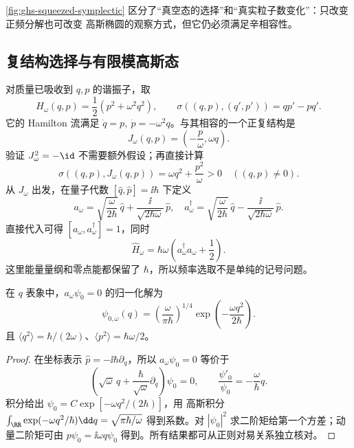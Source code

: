 \cref{fig:ghs-squeezed-symplectic} 区分了“真空态的选择”和“真实粒子数变化”：只改变正频分解也可改变 高斯椭圆的观察方式，但它仍必须满足辛相容性。

\subsection{复结构选择与有限模高斯态}

对质量已吸收到 $q,p$ 的谐振子，取
\begin{equation}\label{eq:ghs-r6-oscillator-H}
H_\omega(q,p)=\frac12(p^2+\omega^2q^2),\qquad
\sigma((q,p),(q',p'))=qp'-pq'.
\end{equation}
它的 Hamilton 流满足 $\dot q=p,\ \dot p=-\omega^2q$。与其相容的一个正复结构是
\begin{equation}\label{eq:ghs-r6-oscillator-J}
J_\omega(q,p)=\left(-\frac p\omega,\omega q\right).
\end{equation}
验证 $J_\omega^2=-\id$ 不需要额外假设；再直接计算
\[
\sigma((q,p),J_\omega(q,p))=\omega q^2+\frac{p^2}{\omega}>0
\quad((q,p)\ne0).
\]
从 $J_\omega$ 出发，在量子代数 $[\widehat q,\widehat p]=\ii\hbar$ 下定义
\begin{equation}\label{eq:ghs-oscillator-annihilator-general}
 a_\omega=\sqrt{\frac{\omega}{2\hbar}}\,\widehat q
 +\frac{\ii}{\sqrt{2\hbar\omega}}\,\widehat p,
\quad
 a_\omega^\dagger=\sqrt{\frac{\omega}{2\hbar}}\,\widehat q
 -\frac{\ii}{\sqrt{2\hbar\omega}}\,\widehat p.
\end{equation}
直接代入可得 $[a_\omega,a_\omega^\dagger]=1$，同时
\begin{equation}\label{eq:ghs-r6-oscillator-number}
\widehat H_\omega=\hbar\omega\left(a_\omega^\dagger a_\omega+\frac12\right).
\end{equation}
这里能量量纲和零点能都保留了 $\hbar$，所以频率选取不是单纯的记号问题。

\begin{theorem}[一个模态的真空波函数]
在 $q$ 表象中，$a_\omega\psi_0=0$ 的归一化解为
\begin{equation}\label{eq:ghs-r6-gaussian-vacuum}
\psi_{0,\omega}(q)=\left(\frac{\omega}{\pi\hbar}\right)^{1/4}
\exp\left(-\frac{\omega q^2}{2\hbar}\right).
\end{equation}
且 $\langle q^2\rangle=\hbar/(2\omega)$、$\langle p^2\rangle=\hbar\omega/2$。
\end{theorem}
\begin{proof}
在坐标表示 $\widehat p=-\ii\hbar\partial_q$，所以 $a_\omega\psi_0=0$ 等价于
\[
\left(\sqrt{\omega}\,q+\frac{\hbar}{\sqrt\omega}\partial_q\right)\psi_0=0,
\qquad\frac{\psi'_0}{\psi_0}=-\frac{\omega}{\hbar}q.
\]
积分给出 $\psi_0=C\exp[-\omega q^2/(2\hbar)]$，用 高斯积分 $\int_\RR\exp(-\omega q^2/\hbar)\dd q=\sqrt{\pi\hbar/\omega}$ 得到系数。对 $|\psi_0|^2$ 求二阶矩给第一个方差；动量二阶矩可由 $p\psi_0=\ii\omega q\psi_0$ 得到。所有结果都可从正则对易关系独立核对。
\end{proof}


